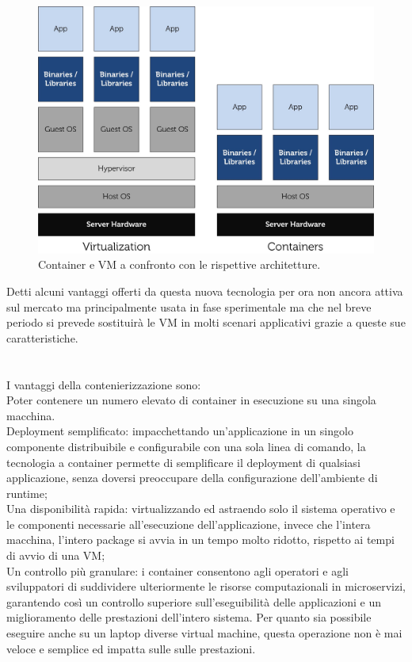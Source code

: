 \documentclass[a4paper,12pt,openright,twoside]{report}
\begin{document}
\begin{figure}[H]
	\begin{center}
		\includegraphics[width=0.99\columnwidth]{img/vm-container.jpg}
		\caption{Container e VM a confronto con le rispettive architetture.}
		\label{img:architettura}
	\end{center}
\end{figure}
Detti alcuni vantaggi offerti da questa nuova tecnologia per ora non ancora attiva sul mercato ma principalmente usata in fase sperimentale ma che nel breve periodo si prevede sostituirà le VM in molti scenari applicativi grazie a queste sue caratteristiche.\\\\\\
I vantaggi della contenierizzazione sono:\\
Poter contenere un numero elevato di container in esecuzione su una singola macchina.\\
Deployment semplificato: impacchettando un’applicazione in un singolo componente distribuibile e configurabile con una sola linea di comando, la tecnologia a container permette di semplificare il deployment di qualsiasi applicazione, senza doversi preoccupare della configurazione dell’ambiente di runtime;\\Una disponibilità rapida: virtualizzando ed astraendo solo il sistema operativo e le componenti necessarie all’esecuzione dell’applicazione, invece che l’intera macchina, l’intero package si avvia in un tempo molto ridotto, rispetto ai tempi di avvio di una VM;\\
Un controllo più granulare: i container consentono agli operatori e agli sviluppatori di suddividere ulteriormente le risorse computazionali in microservizi, garantendo così un controllo superiore sull’eseguibilità delle applicazioni e un miglioramento delle prestazioni dell’intero sistema. Per quanto sia possibile eseguire anche su un laptop diverse virtual machine, questa operazione non è mai veloce e semplice ed impatta sulle sulle prestazioni.\\
\end{document}
